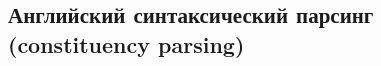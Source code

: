 \documentclass{article}
\begin{document}


\subsection{Английский синтаксический парсинг (constituency parsing)}
\end{document}

